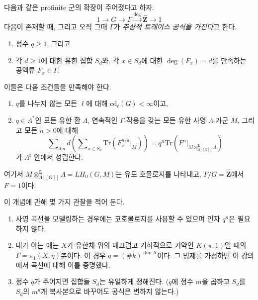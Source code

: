 \noindent
다음과 같은 profinite 군의 확장이 주어졌다고 하자.
$$
1 \to G \to \Gamma \xrightarrow{\deg} \widehat{\mathbf{Z}} \to 1
$$
다음이 존재할 때, 그리고 오직 그때 $\Gamma$가
{\it 추상적 트레이스 공식을 가진다}고 한다.
\begin{enumerate}
\item 정수 $q\geq 1$, 그리고
\item 각 $d\geq 1$에 대한 유한 집합 $S_d$와, 각 $x\in S_d$에 대한
$\deg(F_x) = d$를 만족하는 공액류 $F_x \in \Gamma$.
\end{enumerate}
이들은 다음 조건들을 만족해야 한다.
\begin{enumerate}
\item $q$를 나누지 않는 모든 $\ell$에 대해
$\text{cd}_\ell(G)<\infty$이고,
\item $q\in \Lambda^*$인 모든 유한 환 $\Lambda$, 연속적인
$\Gamma$-작용을 갖는 모든 유한 사영 $\Lambda$-가군 $M$, 그리고
모든 $n > 0$에 대해
$$
\sum\nolimits_{d|n}d \left(
\sum\nolimits_{x \in S_d}
\text{Tr}( F_x^{n/d} |_M)
\right)
=
q^n \text{Tr}(F^n|_{M \otimes_{\Lambda[[G]]}^{\mathbf{L}}\Lambda})
$$
가 $\Lambda^\natural$ 안에서 성립한다.
\end{enumerate}
여기서 $M \otimes_{\Lambda[[G]]}^{\mathbf{L}}\Lambda = LH_0(G, M)$는
유도 호몰로지를 나타내고, $\Gamma/G = \widehat{\mathbf{Z}}$에서
$F=1$이다.

\begin{remark}
\label{remark-abstract-trace-formula}
이 개념에 관해 몇 가지 관찰을 적어 둔다.
\begin{enumerate}
\item 사영 곡선을 모델링하는 경우에는 코호몰로지를 사용할 수 있으며
인자 $q^n$은 필요하지 않다.
\item 내가 아는 예는 $X$가 유한체 위의 매끄럽고 기하적으로 기약인
$K(\pi, 1)$일 때의 $\Gamma = \pi_1(X, \overline \eta)$뿐이다.
이 경우 $q = (\# k)^{\dim X}$이다. 그 명제를 가정하면 이 강의에서
곡선에 대해 이를 증명했다.
\item 정수 $q$가 주어지면 집합들 $S_d$는 유일하게 정해진다.
($q$에 정수 $m$을 곱하고 $S_d$를 $S_d$의 $m^d$개 복사본으로
바꾸어도 공식은 변하지 않는다.)
\end{enumerate}
\end{remark}

